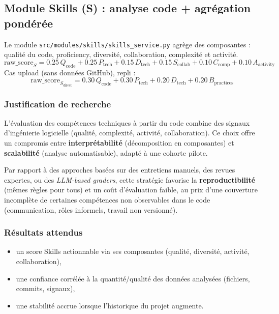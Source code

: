 \documentclass[11pt,a4paper]{article}
\begin{document}
\subsection{Module Skills (S) : analyse code + agr\'egation pond\'er\'ee}
Le module \texttt{src/modules/skills/skills\_service.py} agr\`ege des composantes : qualit\'e du code, proficiency, diversit\'e, collaboration, complexit\'e et activit\'e.
\begin{equation}
\text{raw\_score}_S = 0.25\,Q_{\text{code}} + 0.25\,P_{\text{tech}} + 0.15\,D_{\text{tech}} + 0.15\,S_{\text{collab}} + 0.10\,C_{\text{comp}} + 0.10\,A_{\text{activity}}
\end{equation}
Cas \og upload \fg{} (sans donn\'ees GitHub), repli :
\begin{equation}
\text{raw\_score}_{S_{\text{direct}}} = 0.30\,Q_{\text{code}} + 0.30\,P_{\text{tech}} + 0.20\,D_{\text{tech}} + 0.20\,B_{\text{practices}}
\end{equation}

\subsubsection*{Justification de recherche}
L'\'evaluation des comp\'etences techniques \`a partir du code combine des signaux d'ing\'enierie logicielle (qualit\'e, complexit\'e, activit\'e, collaboration). Ce choix offre un compromis entre \textbf{interpr\'etabilit\'e} (d\'ecomposition en composantes) et \textbf{scalabilit\'e} (analyse automatisable), adapt\'e \`a une cohorte pilote.

 Par rapport \`a des approches bas\'ees sur des entretiens manuels, des revues expertes, ou des \textit{LLM-based graders}, cette strat\'egie favorise la \textbf{reproductibilit\'e} (m\^emes r\`egles pour tous) et un co\^ut d'\'evaluation faible, au prix d'une couverture incompl\`ete de certaines comp\'etences non observables dans le code (communication, r\^oles informels, travail non versionn\'e).

\subsubsection*{R\'esultats attendus}
\begin{itemize}
    \item un score Skills actionnable via ses composantes (qualit\'e, diversit\'e, activit\'e, collaboration),
    \item une confiance corr\'el\'ee \`a la quantit\'e/qualit\'e des donn\'ees analys\'ees (fichiers, commits, signaux),
    \item une stabilit\'e accrue lorsque l'historique du projet augmente.
\end{itemize}
\end{document}
